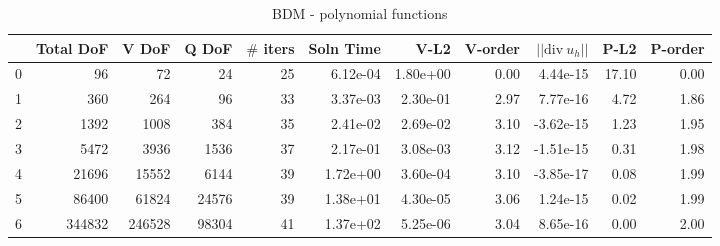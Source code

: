 \documentclass[12pt]{extarticle}
\numberwithin{equation}{section}    %
\begin{document}
\begin{landscape}
\begin{table}
\begin{tabular}{lrrrrrrrrrr}
\hline
{} &  Total DoF &   V DoF &  Q DoF &  $\#$ iters &  Soln Time &      V-L2 &  V-order &  $||\mbox{div} \ u_h||$ &   P-L2 &  P-order \\
\hline
0 &         96 &      72 &     24 &       25 &   6.12e-04 &  1.80e+00 &     0.00 &     4.44e-15 &  17.10 &     0.00 \\
1 &        360 &     264 &     96 &       33 &   3.37e-03 &  2.30e-01 &     2.97 &     7.77e-16 &   4.72 &     1.86 \\
2 &       1392 &    1008 &    384 &       35 &   2.41e-02 &  2.69e-02 &     3.10 &    -3.62e-15 &   1.23 &     1.95 \\
3 &       5472 &    3936 &   1536 &       37 &   2.17e-01 &  3.08e-03 &     3.12 &    -1.51e-15 &   0.31 &     1.98 \\
4 &      21696 &   15552 &   6144 &       39 &   1.72e+00 &  3.60e-04 &     3.10 &    -3.85e-17 &   0.08 &     1.99 \\
5 &      86400 &   61824 &  24576 &       39 &   1.38e+01 &  4.30e-05 &     3.06 &     1.24e-15 &   0.02 &     1.99 \\
6 &     344832 &  246528 &  98304 &       41 &   1.37e+02 &  5.25e-06 &     3.04 &     8.65e-16 &   0.00 &     2.00 \\
\hline
\end{tabular}

\caption{BDM - polynomial functions}

\end{table}

\end{landscape}









\end{document}
